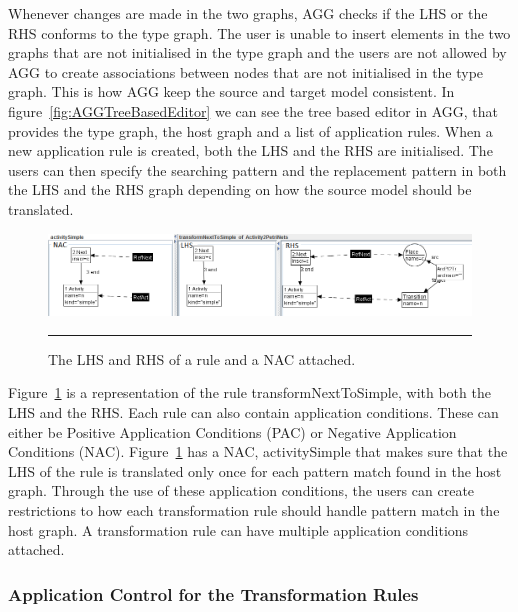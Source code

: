Whenever changes are made in the two graphs, AGG checks if the LHS or the RHS
conforms to the type graph. The user is unable to insert elements in the two
graphs that are not initialised in the type graph and the users are not allowed
by AGG to create associations between nodes that are not initialised in the type
graph. This is how AGG keep the source and target model consistent. In
figure~\ref{fig:AGGTreeBasedEditor} we can see the tree based editor in AGG,
that provides the type graph, the host graph and a list of application rules.
When a new application rule is created, both the LHS and the RHS are
initialised. The users can then specify the searching pattern and the
replacement pattern in both the LHS and the RHS graph depending on how
the source model should be translated.

\begin{figure}[H]
	\centering
	\includegraphics[scale=0.5]{figures/LHSvsRHSAGG.png}
	\rule{35em}{0.5pt}
	\caption[Representation of a rule in AGG]
	{The LHS and RHS of a rule and a NAC attached.}
	\label{fig:LHSvsRHSAGG}
\end{figure}

Figure~\ref{fig:LHSvsRHSAGG} is a representation of the rule
transformNextToSimple, with both the LHS and the RHS. Each rule can also
contain application conditions. These can either be Positive Application
Conditions (PAC) or Negative Application Conditions (NAC).
Figure~\ref{fig:LHSvsRHSAGG} has a NAC, activitySimple that makes sure that the
LHS of the rule is translated only once for each pattern match found in the
host graph. Through the use of these application conditions, the users can
create restrictions to how each transformation rule should handle pattern match
in the host graph. A transformation rule can have multiple application
conditions attached.

\subsubsection*{Application Control for the Transformation Rules}

